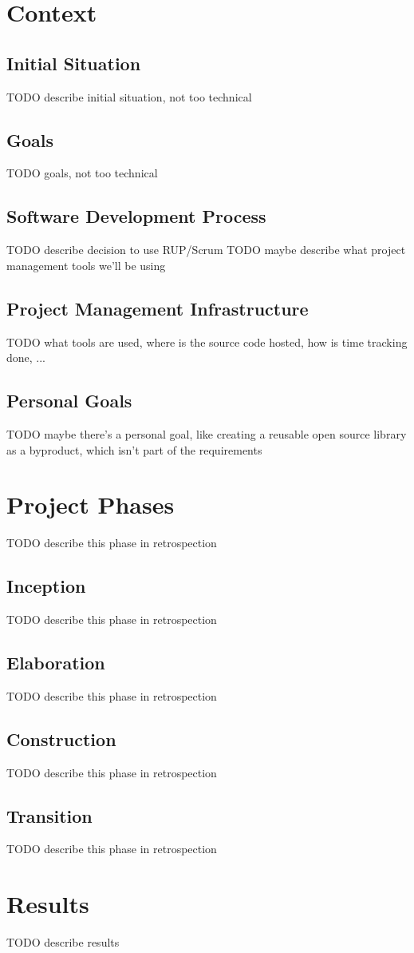 \chapter{Context}
\section{Initial Situation}
TODO describe initial situation, not too technical

\section{Goals}
TODO goals, not too technical

\section{Software Development Process}
TODO describe decision to use RUP/Scrum
TODO maybe describe what project management tools we'll be using

\section{Project Management Infrastructure}
TODO what tools are used, where is the source code hosted, how is time tracking done, ...

\section{Personal Goals}
TODO maybe there's a personal goal, like creating a reusable open source library as a byproduct, which isn't part of the requirements

\chapter{Project Phases}
TODO describe this phase in retrospection

\section{Inception}
TODO describe this phase in retrospection

\section{Elaboration}
TODO describe this phase in retrospection

\section{Construction}
TODO describe this phase in retrospection

\section{Transition}
TODO describe this phase in retrospection

\chapter{Results}
TODO describe results
